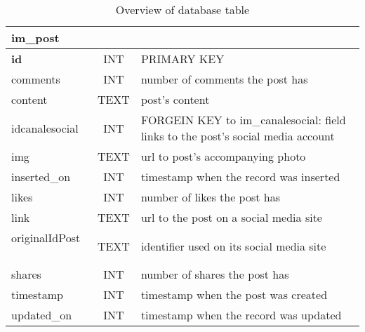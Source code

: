 \begin{table}[H]
\centering
\onehalfspacing

\begin{tabularx}{0.95\textwidth}{ l || c | X }
	\hline
	\multicolumn{3}{l}{ \textbf{im\_post} } \\
	\hline

 	\textbf{id} & INT & PRIMARY KEY \\  
	comments & INT & number of comments the post has \\  
	content & TEXT & post's content \\  
	idcanalesocial & INT & FORGEIN KEY to im\_canalesocial: \newline field links to the post's social media account \\  
	img & TEXT & url to post's accompanying photo \\  
	inserted\_on & INT & timestamp when the record was inserted \\  
	likes & INT & number of likes the post has \\  
	link & TEXT & url to the post on a social media site \\  
	originalIdPost \ \  & TEXT & identifier used on its social media site \\ 
	shares & INT & number of shares the post has \\ 
	timestamp & INT & timestamp when the post was created \\ 
	updated\_on & INT & timestamp when the record was updated \\ 
  
	\hline
\end{tabularx}
\caption{Overview of  database table}
\label{tab:im-post}

\end{table}